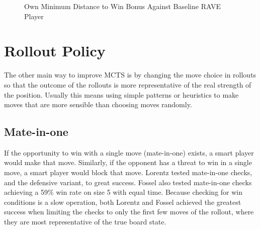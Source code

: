 \begin{figure}
	\centering
{}
	\caption[Own Minimum Distance to Win]{Own Minimum Distance to Win Bonus Against Baseline RAVE Player}
	\label{fig:distancesides}
\end{figure}


\section{Rollout Policy}

The other main way to improve MCTS is by changing the move choice in rollouts so that the outcome of the rollouts is more representative of the real strength of the position. Usually this means using simple patterns or heuristics to make moves that are more sensible than choosing moves randomly.

\subsection{Mate-in-one}

If the opportunity to win with a single move (mate-in-one) exists, a smart player would make that move. Similarly, if the opponent has a threat to win in a single move, a smart player would block that move. Lorentz tested mate-in-one checks, and the defensive variant, to great success. Fossel also tested mate-in-one checks achieving a 59\% win rate on size 5 with equal time\cite{fossel2010monte}. Because checking for win conditions is a slow operation, both Lorentz and Fossel achieved the greatest success when limiting the checks to only the first few moves of the rollout, where they are most representative of the true board state.


